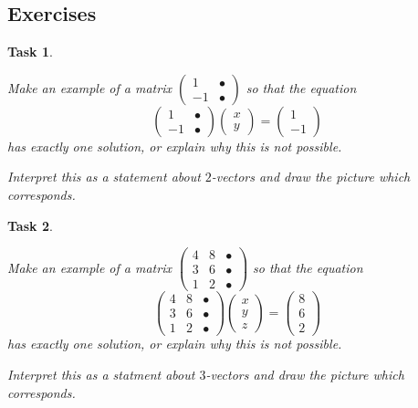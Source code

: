 \documentclass[10pt,]{book}
\theoremstyle{plain}
\numberwithin{equation}{section}
\newtheorem{task}{Task}[chapter]
\begin{document}
\subsection[Exercises]{Exercises}\label{subsection-14}
\begin{task}
\label{task-23}

          Make an example of a matrix \(\left(\begin{smallmatrix} 1 &
          \bullet \\ -1 & \bullet \end{smallmatrix}\right)\) so that the
          equation\[
          \begin{pmatrix} 1 & \bullet \\ -1 & \bullet \end{pmatrix}
          \begin{pmatrix} x \\ y \end{pmatrix} = \begin{pmatrix} 1 \\ -1
          \end{pmatrix}
          \]
          has exactly one solution, or explain why this is not possible.
\par

          Interpret this as a statement about \(2\)-vectors and draw the
          picture which corresponds.
\end{task}
\begin{task}
\label{task-24}

          Make an example of a matrix \(\left(\begin{smallmatrix} 4 &
          8 & \bullet \\ 3 & 6 & \bullet \\ 1 & 2 &
          \bullet \end{smallmatrix}\right)\) so that the equation\[
            \begin{pmatrix} 4 & 8 & \bullet \\ 3 & 6 & \bullet \\ 1 & 2 & \bullet \end{pmatrix} \begin{pmatrix} x \\ y \\ z \end{pmatrix} = \begin{pmatrix} 8 \\ 6 \\ 2 \end{pmatrix}
          \]
          has exactly one solution, or explain why this is not possible.
\par

          Interpret this as a statment about \(3\)-vectors and draw the
          picture which corresponds.
\end{task}
\end{document}
